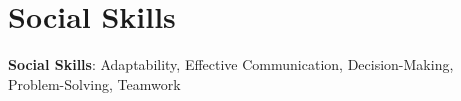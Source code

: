 \documentclass[letterpaper,11pt]{article}
\begin{document}
\section{Social Skills}
\begin{itemize}[leftmargin=0.15in, label={}]
	\small{\item{
                        \textbf{Social Skills}{: Adaptability, Effective Communication, Decision-Making, Problem-Solving, Teamwork} \\
		      }}
\end{itemize}
\end{document}
